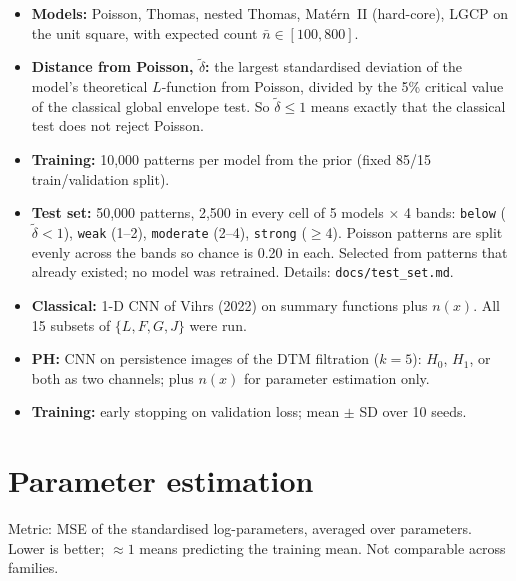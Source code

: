 \documentclass[10pt,a4paper]{article}
\newcommand{\nbar}{\bar n}
\newcommand{\dtil}{\tilde\delta}
\begin{document}
\begin{itemize}
  \item \textbf{Models:} Poisson, Thomas, nested Thomas, Mat\'ern~II (hard-core), LGCP on the unit square, with expected count $\nbar \in [100, 800]$.
  \item \textbf{Distance from Poisson, $\dtil$:} the largest standardised deviation of the model's theoretical $L$-function from Poisson, divided by the 5\% critical value of the classical global envelope test. So $\dtil \le 1$ means exactly that the classical test does not reject Poisson.
  \item \textbf{Training:} 10{,}000 patterns per model from the prior (fixed 85/15 train/validation split).
  \item \textbf{Test set:} 50{,}000 patterns, 2{,}500 in every cell of 5 models $\times$ 4 bands: \texttt{below} ($\dtil<1$), \texttt{weak} (1--2), \texttt{moderate} (2--4), \texttt{strong} ($\ge 4$). Poisson patterns are split evenly across the bands so chance is 0.20 in each. Selected from patterns that already existed; no model was retrained. Details: \texttt{docs/test\_set.md}.
  \item \textbf{Classical:} 1-D CNN of Vihrs (2022) on summary functions plus $n(x)$. All 15 subsets of $\{L,F,G,J\}$ were run.
  \item \textbf{PH:} CNN on persistence images of the DTM filtration ($k=5$): $H_0$, $H_1$, or both as two channels; plus $n(x)$ for parameter estimation only.
  \item \textbf{Training:} early stopping on validation loss; mean $\pm$ SD over 10 seeds.
\end{itemize}

\section{Parameter estimation}

Metric: MSE of the standardised log-parameters, averaged over parameters. Lower is better; $\approx 1$ means predicting the training mean. Not comparable across families.




\end{document}
